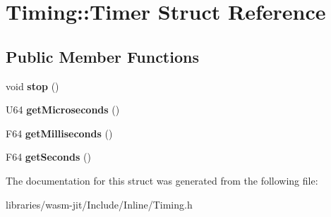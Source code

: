 \hypertarget{struct_timing_1_1_timer}{}\section{Timing\+:\+:Timer Struct Reference}
\label{struct_timing_1_1_timer}
\subsection*{Public Member Functions}
\begin{DoxyCompactItemize}
\item 
\mbox{\label{struct_timing_1_1_timer_a4603a572adbb48e1cadcf95c5846de75}} 
void {\bfseries stop} ()
\item 
\mbox{\label{struct_timing_1_1_timer_ac760ddd9eabf7c5b14bba1e792ec5ed6}} 
U64 {\bfseries get\+Microseconds} ()
\item 
\mbox{\label{struct_timing_1_1_timer_ae6ed9f702858e72d8a5b3df42b35537a}} 
F64 {\bfseries get\+Milliseconds} ()
\item 
\mbox{\label{struct_timing_1_1_timer_a3c7d59a2483864e161bd18d0b66e4d06}} 
F64 {\bfseries get\+Seconds} ()
\end{DoxyCompactItemize}


The documentation for this struct was generated from the following file\+:\begin{DoxyCompactItemize}
\item 
libraries/wasm-\/jit/\+Include/\+Inline/Timing.\+h\end{DoxyCompactItemize}
